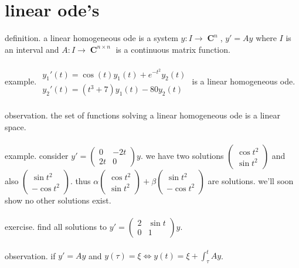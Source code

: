 \documentclass{article}
\DeclareMathOperator{\C}{\mathbf{C}}
\begin{document}
\newpage
\section*{linear ode's}
definition. a linear homogeneous ode is a system $y:I\to \C^n$, $y'=Ay$ where $I$ is an interval and $A:I\to \C^{n\times n}$ is a continuous matrix function. \\\\
example. $\begin{array}{c}
y_{1}'(t)=\cos(t)y_{1}(t)+e^{-t^{2}}y_{2}(t)\\
y_{2}'(t)=(t^{3}+7)y_{1}(t)-80y_{2}(t)
\end{array}$ is a linear homogeneous ode. \\\\
observation. the set of functions solving a linear homogeneous ode is a linear space. \\\\
example. consider $y'=\left(\begin{array}{cc}
0 & -2t\\
2t & 0
\end{array}\right)y$. we have two solutions $\left(\begin{array}{c}
\cos t^{2}\\
\sin t^{2}
\end{array}\right)$ and also $\left(\begin{array}{c}
\sin t^{2}\\
-\cos t^{2}
\end{array}\right)$. thus $\alpha \left(\begin{array}{c}
\cos t^{2}\\
\sin t^{2}
\end{array}\right)+\beta\left(\begin{array}{c}
\sin t^{2}\\
-\cos t^{2}
\end{array}\right)$ are solutions. we'll soon show no other solutions exist.\\\\
exercise. find all solutions to $y'=\left(\begin{array}{cc}
2 & \sin t\\
0 & 1
\end{array}\right)y$. \\\\
observation. if $y'=Ay$ and $y(\tau)=\xi\iff y(t)=\xi+\int_\tau^t Ay$. \\\\
\end{document}
